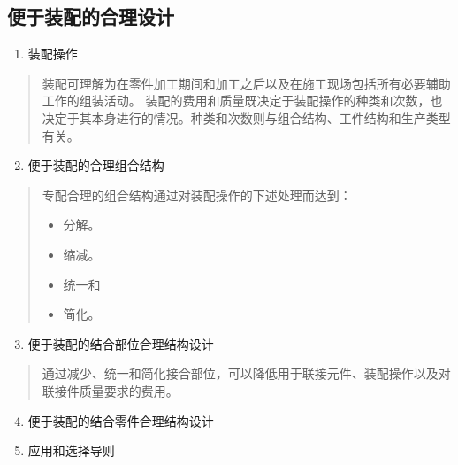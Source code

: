 \documentclass[letterpaper,10pt,english]{sphinxmanual}
\begin{document}
\subsection{便于装配的合理设计}
\label{unit6:id21}\begin{enumerate}
\item {} 
装配操作

\end{enumerate}
\begin{quote}

装配可理解为在零件加工期间和加工之后以及在施工现场包括所有必要辅助工作的组装活动。
装配的费用和质量既决定于装配操作的种类和次数，也决定于其本身进行的情况。种类和次数则与组合结构、工件结构和生产类型有关。
\end{quote}
\begin{enumerate}
\setcounter{enumi}{1}
\item {} 
便于装配的合理组合结构

\end{enumerate}
\begin{quote}

专配合理的组合结构通过对装配操作的下述处理而达到：
\begin{itemize}
\item {} 
分解。

\item {} 
缩减。

\item {} 
统一和

\item {} 
简化。

\end{itemize}
\end{quote}
\begin{enumerate}
\setcounter{enumi}{2}
\item {} 
便于装配的结合部位合理结构设计

\end{enumerate}
\begin{quote}

通过减少、统一和简化接合部位，可以降低用于联接元件、装配操作以及对联接件质量要求的费用。
\end{quote}
\begin{enumerate}
\setcounter{enumi}{3}
\item {} 
便于装配的结合零件合理结构设计

\item {} 
应用和选择导则

\end{enumerate}
\end{document}
